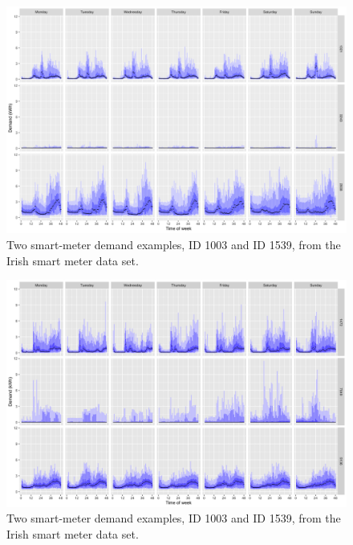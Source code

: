 \documentclass[11pt,a4paper,]{article}
\begin{document}
\begin{figure}

{\centering \includegraphics[width=0.9\linewidth]{figures/hdr_electricity_hdrbox_3id_7dow} 

}

\caption{Two smart-meter demand examples, ID 1003 and ID 1539, from the Irish smart meter data set.}\label{fig:electricityhdrsfixed}
\end{figure}

\begin{figure}

{\centering \includegraphics[width=0.9\linewidth]{figures/electricity_hdrbox_3id_7dow} 

}

\caption{Two smart-meter demand examples, ID 1003 and ID 1539, from the Irish smart meter data set.}\label{fig:electricityhdrsvkde}
\end{figure}
\end{document}

